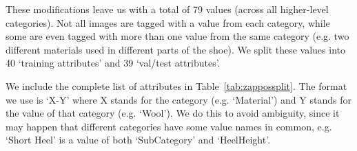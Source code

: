 These modifications leave us with a total of 79 values (across all higher-level categories). Not all images are tagged with a value from each category, while some are even tagged with more than one value from the same category (e.g. two different materials used in different parts of the shoe). We split these values into 40 `training attributes' and 39 `val/test attributes'. %

We include the complete list of attributes in Table~\ref{tab:zappossplit}. The format we use is `X-Y' where X stands for the category (e.g. `Material') and Y stands for the value of that category (e.g. `Wool'). We do this to avoid ambiguity, since it may happen that different categories have some value names in common, e.g. `Short Heel' is a value of both `SubCategory' and `HeelHeight'.
